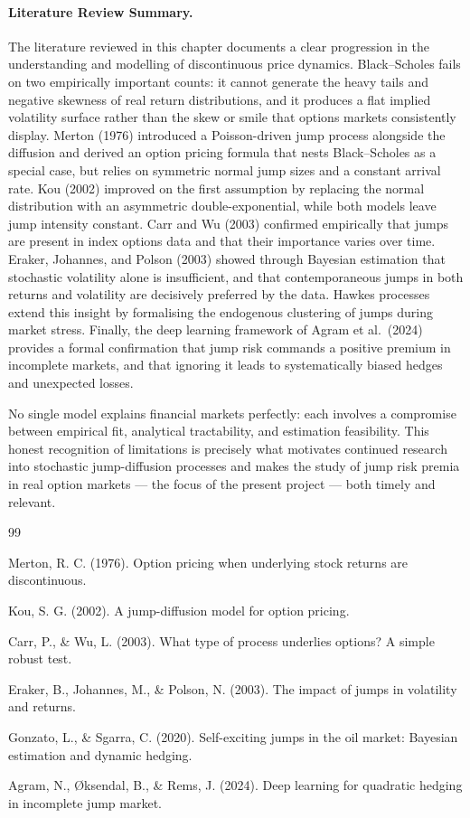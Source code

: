 \documentclass[12pt]{article}
\begin{document}
\paragraph{Literature Review Summary.}
The literature reviewed in this chapter documents a clear progression in the understanding and modelling of discontinuous price dynamics. Black--Scholes fails on two empirically important counts: it cannot generate the heavy tails and negative skewness of real return distributions, and it produces a flat implied volatility surface rather than the skew or smile that options markets consistently display. Merton (1976) introduced a Poisson-driven jump process alongside the diffusion and derived an option pricing formula that nests Black--Scholes as a special case, but relies on symmetric normal jump sizes and a constant arrival rate. Kou (2002) improved on the first assumption by replacing the normal distribution with an asymmetric double-exponential, while both models leave jump intensity constant. Carr and Wu (2003) confirmed empirically that jumps are present in index options data and that their importance varies over time. Eraker, Johannes, and Polson (2003) showed through Bayesian estimation that stochastic volatility alone is insufficient, and that contemporaneous jumps in both returns and volatility are decisively preferred by the data. Hawkes processes extend this insight by formalising the endogenous clustering of jumps during market stress. Finally, the deep learning framework of Agram et al.\ (2024) provides a formal confirmation that jump risk commands a positive premium in incomplete markets, and that ignoring it leads to systematically biased hedges and unexpected losses.

No single model explains financial markets perfectly: each involves a compromise between empirical fit, analytical tractability, and estimation feasibility. This honest recognition of limitations is precisely what motivates continued research into stochastic jump-diffusion processes and makes the study of jump risk premia in real option markets --- the focus of the present project --- both timely and relevant.
\begin{thebibliography}{99}

Merton, R. C. (1976).
Option pricing when underlying stock returns are discontinuous.

Kou, S. G. (2002).
A jump-diffusion model for option pricing.

Carr, P., \& Wu, L. (2003).
What type of process underlies options? A simple robust test.

Eraker, B., Johannes, M., \& Polson, N. (2003).
The impact of jumps in volatility and returns.

Gonzato, L., \& Sgarra, C. (2020).
Self-exciting jumps in the oil market: Bayesian estimation and dynamic hedging.

Agram, N., Øksendal, B., \& Rems, J. (2024).
Deep learning for quadratic hedging in incomplete jump market.

\end{thebibliography}
\end{document}
